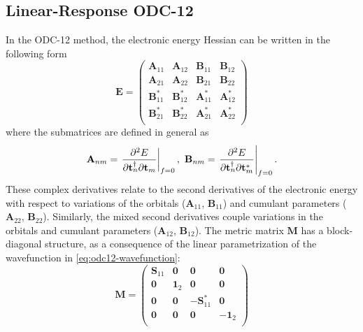 \subsection{Linear-Response ODC-12}
\label{sec:lr_odc12}
In the ODC-12 method, the electronic energy Hessian can be written in the following
form
\begin{equation}
    \label{eq:lr-odc12-hessian-blocks}
    \mathbf{E}
    =
    \begin{pmatrix}
        \mathbf{A}_{11} & \mathbf{A}_{12} & \mathbf{B}_{11} & \mathbf{B}_{12} \\
        \mathbf{A}_{21} & \mathbf{A}_{22} & \mathbf{B}_{21} & \mathbf{B}_{22} \\
        \mathbf{B}_{11}^* & \mathbf{B}_{12}^* & \mathbf{A}_{11}^* & \mathbf{A}_{12}^* \\
        \mathbf{B}_{21}^* & \mathbf{B}_{22}^* & \mathbf{A}_{21}^* & \mathbf{A}_{22}^* \\
    \end{pmatrix}
\end{equation}
where the submatrices are defined in general as
\begin{equation}
    \label{eq:hessian-blocks}
    \mathbf{A}_{nm}
    =
    \left.
    \frac{\partial^2 E}{%
        \partial \mathbf{t}_n^\dagger
        \partial \mathbf{t}_m
    }
    \right|_{f=0}
    ,\ 
    \mathbf{B}_{nm}
    =
    \left.
    \frac{\partial^2 E}{%
        \partial \mathbf{t}_n^\dagger
        \partial \mathbf{t}_m^*
    }
    \right|_{f=0}.
\end{equation}
These complex derivatives relate to the second derivatives of the
electronic energy with respect to variations of the orbitals ($\mathbf{A}_{11}$, $\mathbf{B}_{11}$) and
cumulant parameters ($\mathbf{A}_{22}$, $\mathbf{B}_{22}$).
Similarly, the mixed second derivatives couple variations in the orbitals
and cumulant parameters ($\mathbf{A}_{12}$, $\mathbf{B}_{12}$). 
The metric matrix \(\mathbf{M}\) has a block-diagonal structure, as a
consequence of the linear parametrization of the wavefunction in
\cref{eq:odc12-wavefunction}:
\begin{equation}
    \label{eq:lr-odc12-metric-blocks}
    \mathbf{M}
    =
    \begin{pmatrix}
        \mathbf{S}_{11} & \mathbf{0} & \mathbf{0} & \mathbf{0} \\
        \mathbf{0} & \mathbf{1}_2 & \mathbf{0} & \mathbf{0} \\
        \mathbf{0} & \mathbf{0} & -\mathbf{S}_{11}^* & \mathbf{0} \\
        \mathbf{0} & \mathbf{0} & \mathbf{0} & -\mathbf{1}_2 \\
    \end{pmatrix}
\end{equation}
